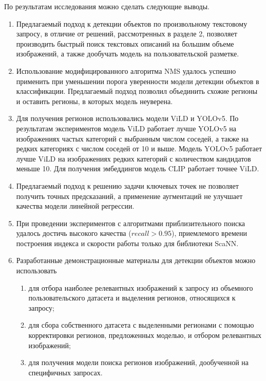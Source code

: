 \documentclass[a4paper,14pt]{article}
\begin{document}
    По результатам исследования можно сделать следующие выводы.
        \begin{enumerate}
    	\itemsep0em
    	\item Предлагаемый подход к детекции объектов по произвольному текстовому запросу, в отличие от решений, рассмотренных в разделе 2, позволяет производить быстрый поиск текстовых описаний на большим объеме изображений, а также дообучать модель на пользовательской разметке.
    	\item  Использование модифицированного алгоритма NMS удалось успешно применить при уменьшении порога уверенности модели детекции объектов в классификации. Предлагаемый подход позволил объединить схожие регионы и оставить регионы, в которых модель неуверена.
    	\item Для получения регионов использовались модели ViLD и YOLOv5.
    	По результатам экспериментов модель ViLD работает лучше YOLOv5 на изображениях частых категорий с выбранным числом соседей, а также на редких категориях с числом соседей от 10 и выше.
    	Модель YOLOv5 работает лучше ViLD на изображениях редких категорий с количеством кандидатов меньше 10.
    	Для получения эмбеддингов модель CLIP работает точнее ViLD.
    	\item Предлагаемый подход к решению задачи ключевых точек не позволяет получить точных предсказаний, а применение аугментаций не улучшает качества модели линейной регрессии.
    	\item При проведении экспериментов с алгоритмами приблизительного поиска удалось достичь высокого качества ($recall > 0.95$), приемлемого времени построения индекса и скорости работы только для библиотеки ScaNN.
    	\item Разработанные демонстрационные материалы для детекции объектов можно использовать
    	\begin{enumerate}
    		\itemsep0em
    		\item для отбора наиболее релевантных изображений к запросу из объемного пользовательского датасета и выделения регионов, относящихся к запросу;
    		\item для сбора собственного датасета с выделенными регионами с помощью корректировки регионов, предложенных моделью, и отбором релевантных изображений;
    		\item для получения модели поиска регионов изображений, дообученной на специфичных запросах.
    	\end{enumerate}
    \end{enumerate}
\end{document}
